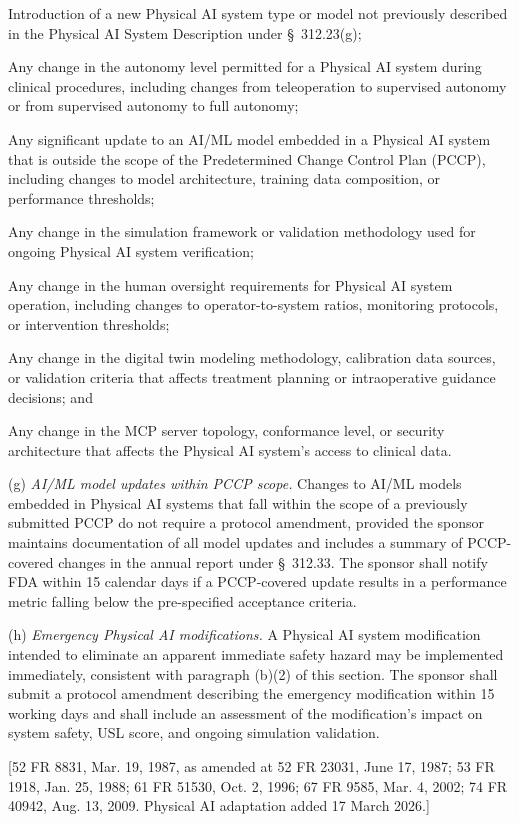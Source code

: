 \begin{description}[leftmargin=0.8cm,style=sameline]
\item[(i)] Introduction of a new Physical AI system type or model not previously described in the Physical AI System Description under \S~312.23(g);
\item[(ii)] Any change in the autonomy level permitted for a Physical AI system during clinical procedures, including changes from teleoperation to supervised autonomy or from supervised autonomy to full autonomy;
\item[(iii)] Any significant update to an AI/ML model embedded in a Physical AI system that is outside the scope of the Predetermined Change Control Plan (PCCP), including changes to model architecture, training data composition, or performance thresholds;
\item[(iv)] Any change in the simulation framework or validation methodology used for ongoing Physical AI system verification;
\item[(v)] Any change in the human oversight requirements for Physical AI system operation, including changes to operator-to-system ratios, monitoring protocols, or intervention thresholds;
\item[(vi)] Any change in the digital twin modeling methodology, calibration data sources, or validation criteria that affects treatment planning or intraoperative guidance decisions; and
\item[(vii)] Any change in the MCP server topology, conformance level, or security architecture that affects the Physical AI system's access to clinical data.
\end{description}

(g) \textit{AI/ML model updates within PCCP scope.} Changes to AI/ML models embedded in Physical AI systems that fall within the scope of a previously submitted PCCP do not require a protocol amendment, provided the sponsor maintains documentation of all model updates and includes a summary of PCCP-covered changes in the annual report under \S~312.33. The sponsor shall notify FDA within 15 calendar days if a PCCP-covered update results in a performance metric falling below the pre-specified acceptance criteria.

(h) \textit{Emergency Physical AI modifications.} A Physical AI system modification intended to eliminate an apparent immediate safety hazard may be implemented immediately, consistent with paragraph (b)(2) of this section. The sponsor shall submit a protocol amendment describing the emergency modification within 15 working days and shall include an assessment of the modification's impact on system safety, USL score, and ongoing simulation validation.

[52 FR 8831, Mar. 19, 1987, as amended at 52 FR 23031, June 17, 1987; 53 FR 1918, Jan. 25, 1988; 61 FR 51530, Oct. 2, 1996; 67 FR 9585, Mar. 4, 2002; 74 FR 40942, Aug. 13, 2009. Physical AI adaptation added 17 March 2026.]
